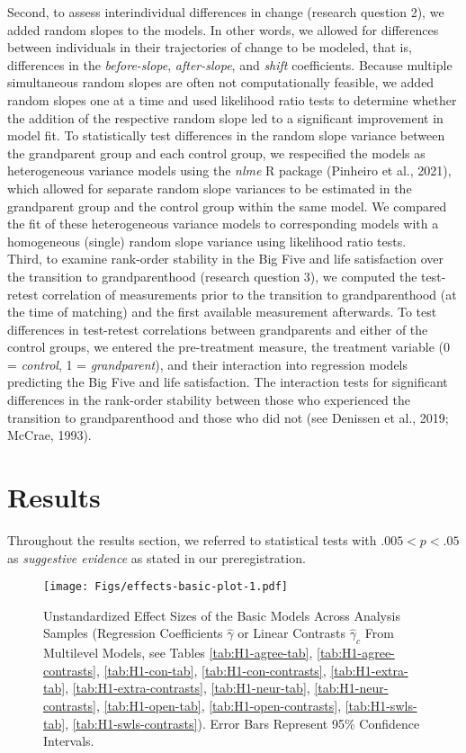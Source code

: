 \documentclass[
  english,
  man,floatsintext]{apa7}
\begin{document}
Second, to assess interindividual differences in change (research question 2), we added random slopes to the models. In other words, we allowed for differences between individuals in their trajectories of change to be modeled, that is, differences in the \emph{before-slope}, \emph{after-slope}, and \emph{shift} coefficients. Because multiple simultaneous random slopes are often not computationally feasible, we added random slopes one at a time and used likelihood ratio tests to determine whether the addition of the respective random slope led to a significant improvement in model fit. To statistically test differences in the random slope variance between the grandparent group and each control group, we respecified the models as heterogeneous variance models using the \emph{nlme} R package (Pinheiro et al., 2021), which allowed for separate random slope variances to be estimated in the grandparent group and the control group within the same model. We compared the fit of these heterogeneous variance models to corresponding models with a homogeneous (single) random slope variance using likelihood ratio tests.\\
Third, to examine rank-order stability in the Big Five and life satisfaction over the transition to grandparenthood (research question 3), we computed the test-retest correlation of measurements prior to the transition to grandparenthood (at the time of matching) and the first available measurement afterwards. To test differences in test-retest correlations between grandparents and either of the control groups, we entered the pre-treatment measure, the treatment variable (0 = \emph{control}, 1 = \emph{grandparent}), and their interaction into regression models predicting the Big Five and life satisfaction. The interaction tests for significant differences in the rank-order stability between those who experienced the transition to grandparenthood and those who did not (see Denissen et al., 2019; McCrae, 1993).

\hypertarget{results}{%
\section{Results}\label{results}}

Throughout the results section, we referred to statistical tests with \(.005 < p < .05\) as \emph{suggestive evidence} as stated in our preregistration.



\begin{figure}
\centering
\texttt{[image: Figs/effects-basic-plot-1.pdf]}
\caption{\label{fig:effects-basic-plot}Unstandardized Effect Sizes of the Basic Models Across Analysis Samples (Regression Coefficients \(\hat{\gamma}\) or Linear Contrasts \(\hat{\gamma}_{c}\) From Multilevel Models, see Tables \ref{tab:H1-agree-tab}, \ref{tab:H1-agree-contrasts}, \ref{tab:H1-con-tab}, \ref{tab:H1-con-contrasts}, \ref{tab:H1-extra-tab}, \ref{tab:H1-extra-contrasts}, \ref{tab:H1-neur-tab}, \ref{tab:H1-neur-contrasts}, \ref{tab:H1-open-tab}, \ref{tab:H1-open-contrasts}, \ref{tab:H1-swls-tab}, \ref{tab:H1-swls-contrasts}). Error Bars Represent 95\% Confidence Intervals.}
\end{figure}
\end{document}
